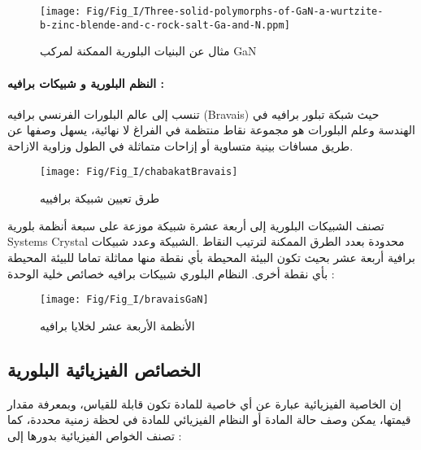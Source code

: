 \begin{figure}[bh]
	\centering
	\texttt{[image: Fig/Fig\_I/Three-solid-polymorphs-of-GaN-a-wurtzite-b-zinc-blende-and-c-rock-salt-Ga-and-N.ppm]}
	\caption{مثال عن البنيات البلورية الممكنة لمركب GaN }
	\label{fig:three-solid-polymorphs-of-gan-a-wurtzite-b-zinc-blende-and-c-rock-salt-ga-and-n}
\end{figure}


\paragraph{النظم البلورية و شبيكات برافيه : }
تنسب إلى عالم البلورات الفرنسي برافيه (Bravais) حيث شبكة تبلور برافيه في الهندسة وعلم البلورات هو مجموعة نقاط منتظمة في الفراغ لا نهائية، يسهل وصفها عن طريق مسافات بينية متساوية أو إزاحات متماثلة في الطول وزاوية الازاحة.

\begin{figure}[bh]
	\centering
	\texttt{[image: Fig/Fig\_I/chabakatBravais]}
	\caption{طرق تعيين شبيكة برافييه}
	\label{fig:chabakatbravais}
\end{figure}

تصنف الشبيكات البلورية إلى أربعة عشرة شبيكة موزعة على سبعة أنظمة بلورية Systems Crystal محدودة بعدد الطرق الممكنة لترتيب النقاط .الشبيكة وعدد شبيكات برافية أربعة عشر بحيث تكون البيئة المحيطة بأي نقطة منها مماثلة تماما للبيئة المحيطة بأي نقطة أخرى.
النظام البلوري شبيكات برافيه خصائص خلية الوحدة :

\begin{figure}[th]
	\centering
	\texttt{[image: Fig/Fig\_I/bravaisGaN]}
	\caption{الأنظمة الأربعة عشر لخلايا برافيه }
	\label{fig:bravaisgan}
\end{figure}

\subsection{الخصائص الفيزيائية البلورية }
إن الخاصية الفيزيائية عبارة عن أي خاصية للمادة تكون قابلة للقياس، وبمعرفة مقدار قيمتها، يمكن وصف حالة المادة أو النظام الفيزيائي للمادة في لحظة زمنية محددة، كما تصنف الخواص الفيزيائية بدورها إلى : 

